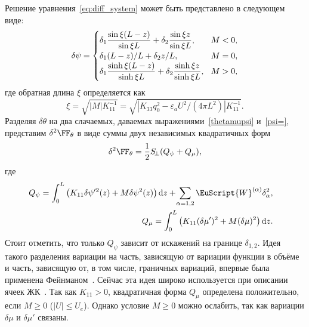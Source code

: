 Решение уравнения~\eqref{eq:diff_system} может быть представлено в следующем виде:
\begin{equation}\label{psi=}
\delta\psi =
\begin{cases}
\displaystyle\delta_1\frac{\sin \xi(L-z)}{\sin\xi L}+\delta_2\frac{\sin\xi z}{\sin\xi L},&\quad M < 0,\hspace{-4mm} \\
\displaystyle\delta_1 (L - {z})/{L} + \delta_2{z}/{L},\hspace{-4mm} &\quad M = 0,\\
\displaystyle\delta_1\frac{\sinh \xi(L-z)}{\sinh\xi L}+\delta_2\frac{\sinh\xi z}{\sinh\xi L},\hspace{-4mm} &\quad M > 0,\\
\end{cases}
\end{equation}
где обратная длина $\xi$ определяется как
\begin{equation}\label{xi=}
\xi = \sqrt{\left|M\right|K_{11}^{-1}} = \sqrt{\left|K_{33}q_0^2-\varepsilon_a U^2/(4\pi L^2)\right|K_{11}^{-1}}.
\end{equation}
Разделяя $\delta\theta$ на два слачаемых, даваемых выражениями~\eqref{thetamupsi} и~\eqref{psi=}, представим $\delta^2\FF_\theta$ в виде суммы двух независимых квадратичных форм
\begin{equation}
\delta^2 \FF_\theta =\frac{1}{2}S_{\!\bot}( Q_\psi + Q_\mu),
\label{eq:separation_into_two_modes}
\end{equation}
где
\begin{eqnarray}\label{Qdelta0}
\hspace{-7mm}&&Q_\psi= \int_{0}^{L}\left(K_{11}\delta\psi'^2(z)+M\delta\psi^2(z)\right)\mathrm{d}z
+\!\sum_{\alpha=1,2}\EuScript{W}^{(\alpha)}\delta_\alpha^2,\\
\hspace{-7mm}&&Q_\mu=\int_{0}^{L}\left(K_{11}(\delta\mu')^2+M(\delta\mu)^2\right)\mathrm{d}z.\label{Qmu}
\end{eqnarray}
Стоит отметить, что только $Q_\psi$ зависит от искажений на границе $\delta_{1,2}$.
Идея такого разделения вариации на часть, зависящую от вариации функции в объёме и часть, зависящую от, в том числе, граничных вариаций, впервые была применена Фейнманом~\cite{Feynman}.
Сейчас эта идея широко используется при описании ячеек ЖК~\cite{VRR2001, Kiselev2004, VAR2013}.
Так как $K_{11}>0$, квадратичная форма $Q_\mu$ определена положительно, если $M\geq 0$ ($|U|\leq U_e$).
Однако условие $M \geq 0$ можно ослабить, так как вариации $\delta\mu$ и $\delta\mu'$ связаны.
